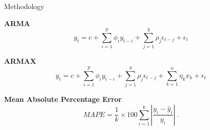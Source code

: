 \documentclass[t,xcolor={table},fleqn]{beamer}
\begin{document}


\begin{frame}{Methodology}

\textbf{ARMA}
\begin{equation}
y_t = c+\sum_{i=1}^{p}\phi_iy_{t-i}+\sum_{j=1}^{q}\rho_j\epsilon_{t-j}+\epsilon_t
\end{equation}

\textbf{ARMAX}
\begin{equation}
y_t = c+\sum_{i=1}^{p}\phi_iy_{t-i}+\sum_{j=1}^{q}\rho_j\epsilon_{t-j}+\sum_{k=1}^{n}\eta_kx_k+\epsilon_t
\end{equation}

\textbf{Mean Absolute Percentage Error}
\begin{equation}
MAPE = \frac{1}{k}\times 100 \sum_{i=1}^{k} \left|\frac{y_i-\hat{y}_i}{y_i}\right|~.
\end{equation}

\end{frame}


\end{document}

